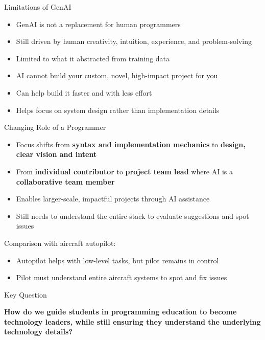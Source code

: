 \documentclass[xcolor=dvipsnames, aspectratio=169]{beamer}
\begin{document}
\begin{frame}{Limitations of GenAI}
  \begin{itemize}
    \item GenAI is not a replacement for human programmers
    \item Still driven by human creativity, intuition, experience, and problem-solving
    \item Limited to what it abstracted from training data
    \item AI cannot build your custom, novel, high-impact project for you
    \item Can help build it faster and with less effort
    \item Helps focus on system design rather than implementation details
  \end{itemize}
\end{frame}

\begin{frame}{Changing Role of a Programmer}
  \begin{itemize}
    \item Focus shifts from \textbf{syntax and implementation mechanics} to \textbf{design, clear vision and intent}
    \item From \textbf{individual contributor} to \textbf{project team lead} where AI is a \textbf{collaborative team member}
    \item Enables larger-scale, impactful projects through AI assistance
    \item Still needs to understand the entire stack to evaluate suggestions and spot issues
  \end{itemize}
  
  \begin{alertbox}
    Comparison with aircraft autopilot:
    \begin{itemize}
      \item Autopilot helps with low-level tasks, but pilot remains in control
      \item Pilot must understand entire aircraft systems to spot and fix issues
    \end{itemize}
  \end{alertbox}
\end{frame}

\begin{frame}{Key Question}
  \begin{center}
    \large\textbf{How do we guide students in programming education to become technology leaders, while still ensuring they understand the underlying technology details?}
  \end{center}
\end{frame}
\end{document}
